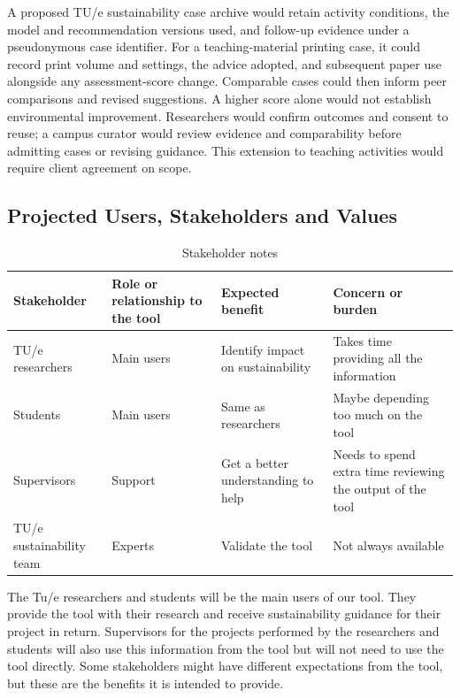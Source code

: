 \documentclass[11pt,a4paper]{article}
\begin{document}
A proposed TU/e sustainability case archive would retain activity conditions, the model and recommendation versions used, and follow-up evidence under a pseudonymous case identifier. For a teaching-material printing case, it could record print volume and settings, the advice adopted, and subsequent paper use alongside any assessment-score change. Comparable cases could then inform peer comparisons and revised suggestions. A higher score alone would not establish environmental improvement. Researchers would confirm outcomes and consent to reuse; a campus curator would review evidence and comparability before admitting cases or revising guidance. This extension to teaching activities would require client agreement on scope.


\FloatBarrier

\FloatBarrier
\subsection{Projected Users, Stakeholders and Values}
\begin{table}[ht]
\centering
\caption{Stakeholder notes}
\label{tab:stakeholders}
\begin{tabularx}{\textwidth}{|X|X|X|X|}
\hline
\textbf{Stakeholder} & \textbf{Role or relationship to the tool} & 
\textbf{Expected benefit} & \textbf{Concern or burden} \\
\hline

TU/e researchers &
Main users &
Identify impact on sustainability &
Takes time providing all the information \\
\hline

Students &
Main users &
Same as researchers &
Maybe depending too much on the tool \\
\hline

Supervisors &
Support &
Get a better understanding to help &
Needs to spend extra time reviewing the output of the tool 
\\
\hline

TU/e sustainability team &
Experts &
Validate the tool &
Not always available \\
\hline

\end{tabularx}
\end{table}

The Tu/e researchers and students will be the main users of our tool. They provide the tool with their research and receive sustainability guidance for their project in return.  Supervisors for the projects performed by the researchers and students will also use this information from the tool but will not need to use the tool directly.  Some stakeholders might have different expectations from the tool, but these are the benefits it is intended to provide.
\end{document}
